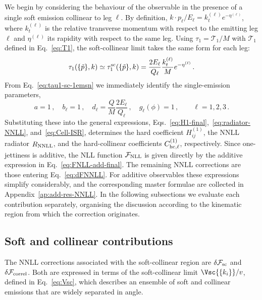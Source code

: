 We begin by considering the behaviour of the observable in the presence of a
single soft emission collinear to leg $\ell$. By definition,
 $k\cdot p_\ell/E_\ell=k_t^{(\ell)} e^{-\eta^{(\ell)}}$, where
  $k_t^{(\ell)}$ is the relative transverse momentum with respect to
  the emitting leg $\ell$ and $\eta^{(\ell)}$ its rapidity with respect to the same leg. 
  Using $\tau_1 = \mathcal{T}_1/M$ with $\mathcal{T}_1$ defined in
Eq.~\eqref{eq:T1}, the soft-collinear limit takes the same form for each leg:
    \begin{equation}
    \label{eq:tau1-sc-1emsn}
    \tau_1(\{\tilde p\},k)\simeq \tau^{\rm sc}_1(\{\tilde p\},k) =  \frac{2E_\ell}{Q_\ell}\frac{k_t^{(\ell)}}{M} e^{-\eta^{(\ell)}}\,.
  \end{equation}
  From Eq.~\eqref{eq:tau1-sc-1emsn}  we immediately identify the single-emission
parameters,
\begin{equation}
  \label{eq:tau1-1em-props}
  a=1\,, \quad b_\ell=1\,, \quad d_\ell=\frac{Q}{M}\frac{2E_{\ell}}{Q_{\ell}} \,, \quad g_\ell(\phi) = 1\,, \qquad \ell=1,2,3\,.
\end{equation}
Substituting these into the general expressions, 
Eqs.~\eqref{eq:H1-final},~\eqref{eq:radiator-NNLL},
and~\eqref{eq:Cell-ISR}, determines the hard coefficient
$H_{ij}^{(1)}$, the NNLL radiator $R_{\rm NNLL}$, and the
hard-collinear coefficients $C_{\rm hc,\ell}^{(1)}$,
respectively. Since one-jettiness is additive, the NLL function
$\mathcal{F}_{\rm NLL}$ is given directly by the additive expression in
Eq.~\eqref{eq:FNLL-add-final}. The remaining NNLL corrections are those 
entering Eq.~\eqref{eq:dFNNLL}. For additive observables these expressions
simplify considerably, and the corresponding master formulae are collected in
Appendix~\ref{ap:add-res-NNLL}. In the
following subsections we evaluate each contribution separately,
organising the discussion according to the kinematic region from which
the correction originates.

\subsection{Soft and collinear contributions}
\label{sec:sc-contributions}

The NNLL corrections associated with the soft-collinear region are
$\delta \mathcal{F}_{\rm sc}$ and $\delta \mathcal{F}_{\rm correl}$. 
Both are expressed in terms of the
soft-collinear limit $\Vsc{\{k_i\}}/v$, defined in Eq.~\eqref{eq:Vsc}, which describes an
ensemble of soft and collinear emissions that are widely separated in
angle.

